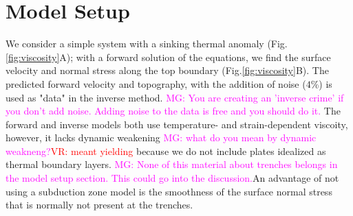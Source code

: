 \documentclass[12pt]{article}
\newcommand{\mgnote}[1]{\textcolor{magenta}{MG: #1}}
\newcommand{\vrnote}[1]{\textcolor{red}{VR: #1}}
\begin{document}
\section*{Model Setup}
We consider a simple system with a sinking thermal anomaly (Fig.\ref{fig:viscosity}A); with a forward solution of the equations, we find the surface velocity and normal stress along the top boundary (Fig.\ref{fig:viscosity}B). The predicted forward velocity and topography, with the addition of noise ($4 \%$) is used as "data" in the inverse method. \mgnote{You are creating an 'inverse crime' if you don't add noise. Adding noise to the data is free and you should do it.} 
The forward and inverse models both use  temperature- and strain-dependent viscoity, however, it lacks dynamic weakening \mgnote{what do you mean by dynamic weakneng?}\vrnote{meant yielding} because we do not include plates idealized as thermal boundary layers. \mgnote{None of this material about trenches belongs in the model setup section. This could go into the discussion.}An advantage of not using a subduction zone model is the smoothness of the surface normal stress that is normally not present at the trenches. %
\end{document}
